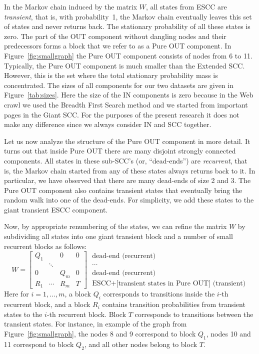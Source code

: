 \documentclass{article}
\begin{document}
In the Markov chain induced by the matrix $W$, all states from ESCC
are {\it transient}, that is, with probability~1, the Markov chain
eventually leaves this set of states and never returns back. The
stationary probability of all these states is zero. The part of the
OUT component without dangling nodes and their predecessors forms a
block that we refer to as a Pure OUT component. In
Figure~\ref{fig:smallgraph} the Pure OUT component consists of nodes
from 6 to 11. Typically, the Pure OUT component is much smaller than
the Extended SCC. However, this is the set where the total
stationary probability mass is concentrated. The sizes of all
components for our two datasets are given in Figure~\ref{tab:sizes}.
Here the size of the IN components is zero because in the Web
crawl we used the Breadth First Search method and we started from
important pages in the Giant SCC. For the purposes of the
present research it does not make any difference since we always
consider IN and SCC together.

Let us now analyze the structure of the Pure OUT component in more
detail. It turns out that inside  Pure OUT there are many disjoint
strongly connected components. All states in these sub-SCC's (or,
``dead-ends'') are {\it recurrent}, that is, the Markov chain
started from any of these states always returns back to it. In
particular, we have observed that there are many dead-ends of size 2
and 3.
The Pure OUT component also contains transient states that
eventually bring the random walk into one of the dead-ends. For
simplicity, we add these states to the giant transient ESCC
component.

Now, by appropriate renumbering of the states, we can refine the
matrix $W$ by subdividing all states into one giant transient block
and a number of small recurrent blocks as follows:
 \begin{equation}
\label{eq:ESCCdetail} W=\left[ \begin{array}{cccc}
Q_1 &        & 0   & 0 \\
    & \ddots &     &   \\
0   &        & Q_m & 0 \\
{R}_1 & \cdots & {R}_m & {T}
\end{array} \right]\;
\begin{array}{l}\mbox{dead-end (recurrent)}\\
\cdots\phantom{\ddots}\\
\mbox{dead-end (recurrent)}\\
\mbox{ESCC+[transient states in Pure OUT] (transient)}\end{array}
\end{equation}
Here for $i=1,\ldots,m$, a block $Q_i$  corresponds to transitions
inside the $i$-th recurrent block, and a block $R_i$ contains
transition probabilities from transient states to the $i$-th
recurrent block. Block ${T}$ corresponds to transitions between the
transient states. For instance, in example of the graph from
Figure~\ref{fig:smallgraph}, the nodes 8 and 9 correspond to block
$Q_1$, nodes 10 and 11 correspond to block $Q_2$, and all other
nodes belong to block $T$.
\end{document}
